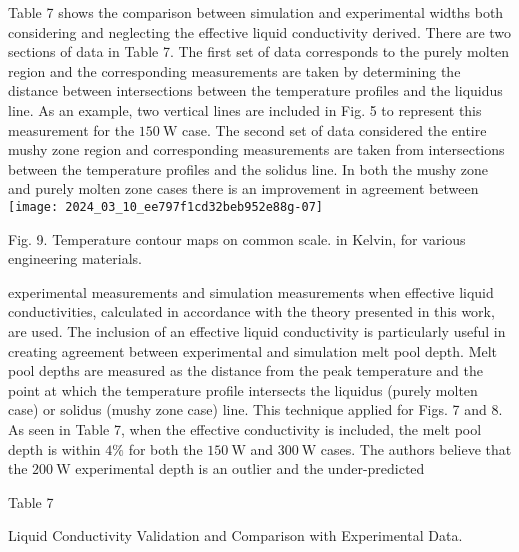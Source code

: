 \documentclass[10pt]{article}
\begin{document}
Table 7 shows the comparison between simulation and experimental widths both considering and neglecting the effective liquid conductivity derived. There are two sections of data in Table 7. The first set of data corresponds to the purely molten region and the corresponding measurements are taken by determining the distance between intersections between the temperature profiles and the liquidus line. As an example, two vertical lines are included in Fig. 5 to represent this measurement for the $150 \mathrm{~W}$ case. The second set of data considered the entire mushy zone region and corresponding measurements are taken from intersections between the temperature profiles and the solidus line. In both the mushy zone and purely molten zone cases there is an improvement in agreement between\\
\texttt{[image: 2024\_03\_10\_ee797f1cd32beb952e88g-07]}

Fig. 9. Temperature contour maps on common scale. in Kelvin, for various engineering materials.

experimental measurements and simulation measurements when effective liquid conductivities, calculated in accordance with the theory presented in this work, are used. The inclusion of an effective liquid conductivity is particularly useful in creating agreement between experimental and simulation melt pool depth. Melt pool depths are measured as the distance from the peak temperature and the point at which the temperature profile intersects the liquidus (purely molten case) or solidus (mushy zone case) line. This technique applied for Figs. 7 and 8. As seen in Table 7, when the effective conductivity is included, the melt pool depth is within $4 \%$ for both the $150 \mathrm{~W}$ and $300 \mathrm{~W}$ cases. The authors believe that the $200 \mathrm{~W}$ experimental depth is an outlier and the under-predicted

Table 7

Liquid Conductivity Validation and Comparison with Experimental Data.
\end{document}
